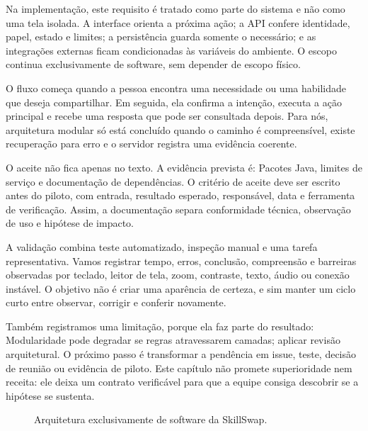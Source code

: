 \documentclass[12pt,oneside,a4paper,article]{abntex2}
\begin{document}
Na implementação, este requisito é tratado como parte do sistema e não como uma tela isolada. A interface orienta a próxima ação; a API confere identidade, papel, estado e limites; a persistência guarda somente o necessário; e as integrações externas ficam condicionadas às variáveis do ambiente. O escopo continua exclusivamente de software, sem depender de escopo físico.

O fluxo começa quando a pessoa encontra uma necessidade ou uma habilidade que deseja compartilhar. Em seguida, ela confirma a intenção, executa a ação principal e recebe uma resposta que pode ser consultada depois. Para nós, arquitetura modular só está concluído quando o caminho é compreensível, existe recuperação para erro e o servidor registra uma evidência coerente.

O aceite não fica apenas no texto. A evidência prevista é: Pacotes Java, limites de serviço e documentação de dependências. O critério de aceite deve ser escrito antes do piloto, com entrada, resultado esperado, responsável, data e ferramenta de verificação. Assim, a documentação separa conformidade técnica, observação de uso e hipótese de impacto.

A validação combina teste automatizado, inspeção manual e uma tarefa representativa. Vamos registrar tempo, erros, conclusão, compreensão e barreiras observadas por teclado, leitor de tela, zoom, contraste, texto, áudio ou conexão instável. O objetivo não é criar uma aparência de certeza, e sim manter um ciclo curto entre observar, corrigir e conferir novamente.

Também registramos uma limitação, porque ela faz parte do resultado: Modularidade pode degradar se regras atravessarem camadas; aplicar revisão arquitetural. O próximo passo é transformar a pendência em issue, teste, decisão de reunião ou evidência de piloto. Este capítulo não promete superioridade nem receita: ele deixa um contrato verificável para que a equipe consiga descobrir se a hipótese se sustenta.

\begin{figure}[ht]
\centering
{}
\caption{Arquitetura exclusivamente de software da SkillSwap.}
\label{fig:arquitetura}
\end{figure}
\end{document}
